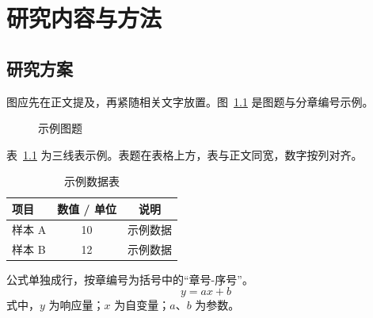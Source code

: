 \chapter{研究内容与方法}
\section{研究方案}
图应先在正文提及，再紧随相关文字放置。图~\ref{fig:example} 是图题与分章编号示例。

\begin{figure}[htbp]
  \centering
  \caption{示例图题}\label{fig:example}
\end{figure}

表~\ref{tab:example} 为三线表示例。表题在表格上方，表与正文同宽，数字按列对齐。
\begin{table}[htbp]
  \centering
  \caption{示例数据表}\label{tab:example}
  \begin{tabular*}{\textwidth}{@{\extracolsep{\fill}}lcc@{}}
    \toprule[1.5pt]
    项目 & 数值 / 单位 & 说明 \\
    \midrule[1pt]
    样本 A & 10 & 示例数据 \\
    样本 B & 12 & 示例数据 \\
    \bottomrule[1.5pt]
  \end{tabular*}
\end{table}

公式单独成行，按章编号为括号中的“章号-序号”。
\begin{equation}\label{eq:example}
  y=ax+b
\end{equation}
\noindent 式中，$y$ 为响应量；$x$ 为自变量；$a$、$b$ 为参数。
